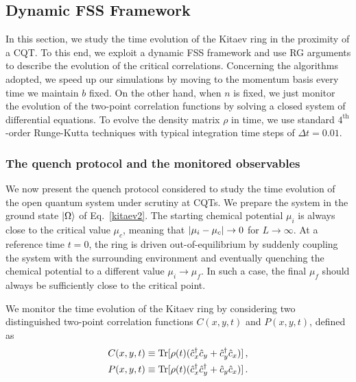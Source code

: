\subsection{Dynamic FSS Framework}


In this section, we study the time evolution of the Kitaev ring in the proximity of a CQT. To this end, we exploit a dynamic FSS framework and use RG arguments to describe the evolution of the critical correlations. Concerning the algorithms adopted, we speed up our simulations by moving to the momentum basis every time we maintain $b$ fixed. On the other hand, when $n$ is fixed, we just monitor the evolution of the two-point correlation functions by solving a closed system of differential equations. To evolve the density matrix $\rho$ in time, we use standard $4^{\text{th}}$-order Runge-Kutta techniques with typical integration time steps of $\Delta t=0.01$.

\subsubsection{The quench protocol and the monitored observables}
\label{sec_observables}

We now present the quench protocol considered to study the time evolution of the open quantum system under scrutiny at CQTs. We prepare the system in the ground state $\ket{\Omega}$ of Eq.~\eqref{kitaev2}. The starting chemical potential $\mu_i$ is always close to the critical value $\mu_c$, meaning that $\lvert\mu_i-\mu_c\rvert\to0$ for $L\to\infty$. At a reference time $t=0$, the ring is driven out-of-equilibrium by suddenly coupling the system with the surrounding environment and eventually quenching the chemical potential to a different value $\mu_i\to\mu_f$. In such a case, the final $\mu_f$ should always be sufficiently close to the critical point. 

We monitor the time evolution of the Kitaev ring by considering two distinguished two-point correlation functions $C(x, y, t)$ and $P(x, y, t)$, defined as
\begin{align}
	C(x, y, t)&\equiv{\rm Tr}[\rho(t)(\hat{c}^\dagger_x\hat{c}_y+\hat{c}^\dagger_y\hat{c}_x)]\,,\\
	P(x, y, t)&\equiv{\rm Tr}[\rho(t)(\hat{c}^\dagger_x\hat{c}^\dagger_y+\hat{c}_y\hat{c}_x)]\,.
    \label{eq_def_two_point_functions_C_P}
\end{align}


